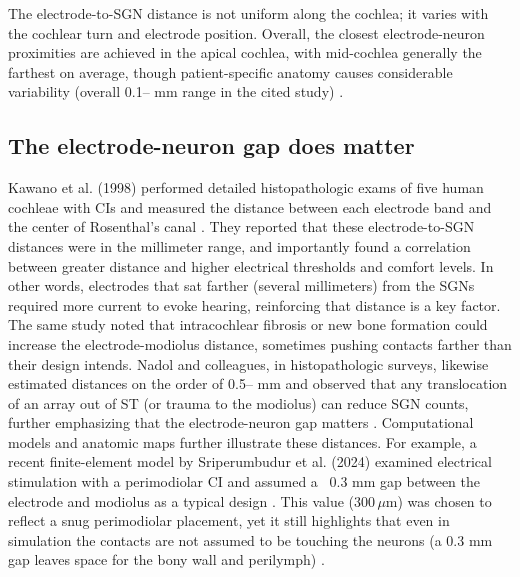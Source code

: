 \documentclass[referee,pdflatex, sn-vancouver-num]{sn-jnl}%
\theoremstyle{thmstyleone}%
\theoremstyle{thmstyletwo}%
\theoremstyle{thmstylethree}%
\newcommand{\um}{\ensuremath{\,\mu\mathrm{m}}}
\DeclareRobustCommand{\textendash}{\ifmmode\text{-}\else\leavevmode\hbox{--}\fi}
\begin{document}
The electrode-to-SGN distance is not uniform along the cochlea; it varies with the cochlear turn and electrode position. Overall, the closest electrode-neuron proximities are achieved in the apical cochlea, with mid-cochlea generally the farthest on average, though patient-specific anatomy causes considerable variability (overall 0.1\textendash1.8 mm range in the cited study) \cite{Long2014}.

\subsection{The electrode-neuron gap does matter}
Kawano et al. (1998) performed detailed histopathologic exams of five human cochleae with CIs and measured the distance between each electrode band and the center of Rosenthal's canal \cite{Kawano1998}. They reported that these electrode-to-SGN distances were in the millimeter range, and importantly found a correlation between greater distance and higher electrical thresholds and comfort levels. In other words, electrodes that sat farther (several millimeters) from the SGNs required more current to evoke hearing, reinforcing that distance is a key factor. The same study noted that intracochlear fibrosis or new bone formation could increase the electrode-modiolus distance, sometimes pushing contacts farther than their design intends. Nadol and colleagues, in histopathologic surveys, likewise estimated distances on the order of 0.5\textendash 2 mm and observed that any translocation of an array out of ST (or trauma to the modiolus) can reduce SGN counts, further emphasizing that the electrode-neuron gap matters \cite{nadol1990,Nadol1989}. Computational models and anatomic maps further illustrate these distances. For example, a recent finite-element model by Sriperumbudur et al. (2024) examined electrical stimulation with a perimodiolar CI and assumed a ~0.3 mm gap between the electrode and modiolus as a typical design \cite{Sriperumbudur2024_SciRep_EfieldPorosity}. This value ($300{\um}$) was chosen to reflect a snug perimodiolar placement, yet it still highlights that even in simulation the contacts are not assumed to be touching the neurons (a 0.3 mm gap leaves space for the bony wall and perilymph) \cite{Sriperumbudur2024}. 
\end{document}
